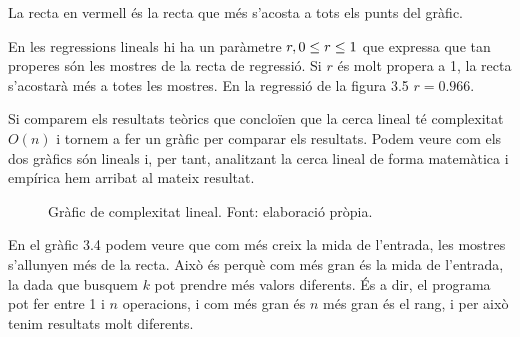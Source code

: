 La recta en vermell és la recta que més s'acosta a tots els punts del gràfic. 

En les regressions lineals hi ha un paràmetre $r, \space 0 \leq r \leq 1$ que expressa que tan properes són les mostres de la recta de regressió. Si $r$ és molt propera a 1, la recta s'acostarà més a totes les mostres. En la regressió de la figura 3.5 $r = 0.966$.

Si comparem els resultats teòrics que concloïen que la cerca lineal té complexitat $O(n)$ i tornem a fer un gràfic per comparar els resultats. Podem veure com els dos gràfics són lineals i, per tant, analitzant la cerca lineal de forma matemàtica i empírica hem arribat al mateix resultat.
\begin{figure}[H]
\centering
{}
    \caption[Gràfic de complexitat lineal.]{Gràfic de complexitat lineal. Font: elaboració pròpia.}
    \label{fig:my_label}
\end{figure}
\vspace{-18pt}
En el gràfic 3.4 podem veure que com més creix la mida de l'entrada, les mostres s'allunyen més de la recta. Això és perquè com més gran és la mida de l'entrada, la dada que busquem $k$ pot prendre més valors diferents. És a dir, el programa pot fer entre 1 i $n$ operacions, i com més gran és $n$ més gran és el rang, i per això tenim resultats molt diferents. 

